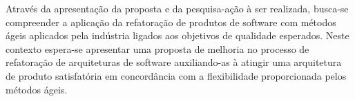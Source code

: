 Através da apresentação da proposta e da pesquisa-ação à ser realizada, busca-se compreender a aplicação da refatoração de produtos de software com métodos ágeis aplicados pela indústria ligados aos objetivos de qualidade esperados. Neste contexto espera-se apresentar uma proposta de melhoria no processo de refatoração de arquiteturas de software auxiliando-as à atingir uma arquitetura de produto satisfatória em concordância com a flexibilidade proporcionada pelos métodos ágeis. 

